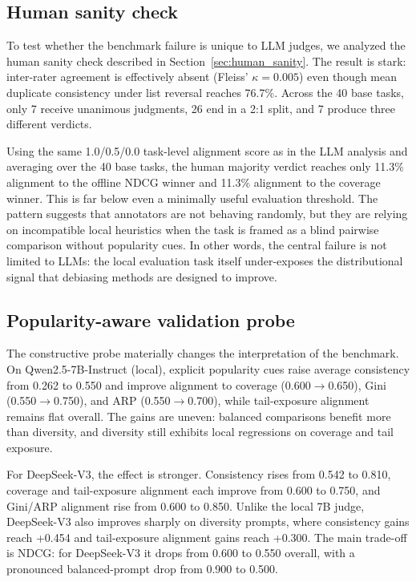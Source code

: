 \documentclass[pdflatex,sn-basic,referee,lineno]{sn-jnl}
\begin{document}
\subsection{Human sanity check}

To test whether the benchmark failure is unique to LLM judges, we analyzed the human sanity check described in Section~\ref{sec:human_sanity}. The result is stark: inter-rater agreement is effectively absent (Fleiss' $\kappa = 0.005$) even though mean duplicate consistency under list reversal reaches 76.7\%. Across the 40 base tasks, only 7 receive unanimous judgments, 26 end in a 2:1 split, and 7 produce three different verdicts.

Using the same 1.0/0.5/0.0 task-level alignment score as in the LLM analysis and averaging over the 40 base tasks, the human majority verdict reaches only 11.3\% alignment to the offline NDCG winner and 11.3\% alignment to the coverage winner. This is far below even a minimally useful evaluation threshold. The pattern suggests that annotators are not behaving randomly, but they are relying on incompatible local heuristics when the task is framed as a blind pairwise comparison without popularity cues. In other words, the central failure is not limited to LLMs: the local evaluation task itself under-exposes the distributional signal that debiasing methods are designed to improve.

\subsection{Popularity-aware validation probe}

The constructive probe materially changes the interpretation of the benchmark. On Qwen2.5-7B-Instruct (local), explicit popularity cues raise average consistency from 0.262 to 0.550 and improve alignment to coverage (0.600$\rightarrow$0.650), Gini (0.550$\rightarrow$0.750), and ARP (0.550$\rightarrow$0.700), while tail-exposure alignment remains flat overall. The gains are uneven: balanced comparisons benefit more than diversity, and diversity still exhibits local regressions on coverage and tail exposure.

For DeepSeek-V3, the effect is stronger. Consistency rises from 0.542 to 0.810, coverage and tail-exposure alignment each improve from 0.600 to 0.750, and Gini/ARP alignment rise from 0.600 to 0.850. Unlike the local 7B judge, DeepSeek-V3 also improves sharply on diversity prompts, where consistency gains reach +0.454 and tail-exposure alignment gains reach +0.300. The main trade-off is NDCG: for DeepSeek-V3 it drops from 0.600 to 0.550 overall, with a pronounced balanced-prompt drop from 0.900 to 0.500.
\end{document}
